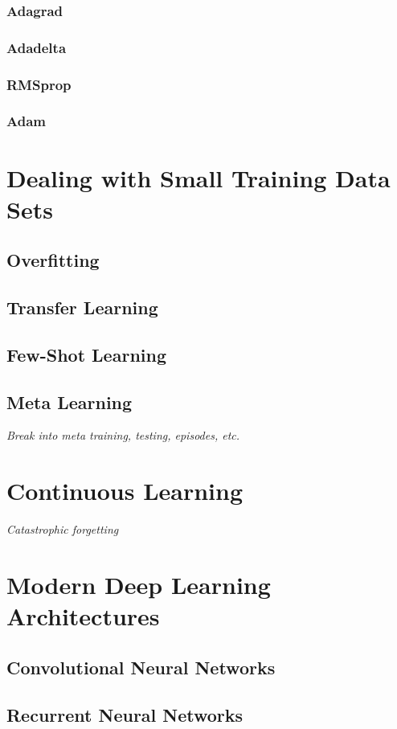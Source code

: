 \documentclass{report}
\begin{document}
	\subsubsection{Adagrad}
	\subsubsection{Adadelta}
	\subsubsection{RMSprop}
	\subsubsection{Adam}
	
	\section{Dealing with Small Training Data Sets}
	\subsection{Overfitting}
	\subsection{Transfer Learning}
	\subsection{Few-Shot Learning}
	\subsection{Meta Learning}
	\textit{Break into meta training, testing, episodes, etc.}
	\section{Continuous Learning}
	\textit{Catastrophic forgetting}
	\section{Modern Deep Learning Architectures}
	\subsection{Convolutional Neural Networks}
	\subsection{Recurrent Neural Networks}
	
\end{document}
